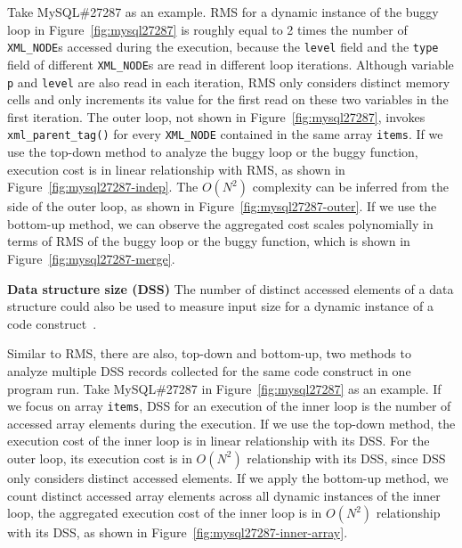 Take MySQL\#27287 as an example.
RMS for a dynamic instance of
the buggy loop in Figure~\ref{fig:mysql27287}
is roughly equal to 2 times the number of \texttt{XML\_NODE}s 
accessed during the execution, 
because the \texttt{level} field and the \texttt{type} field of 
different \texttt{XML\_NODE}s are read in different loop iterations.
Although variable \texttt{p} and \texttt{level} are also read in each iteration,
RMS only considers distinct memory cells and 
only increments its value for the first read on these two variables in the first iteration. 
The outer loop, not shown in Figure~\ref{fig:mysql27287}, 
invokes \texttt{xml\_parent\_tag()} for every \texttt{XML\_NODE} contained
in the same array \texttt{items}.
If we use the top-down method to analyze the buggy loop
or the buggy function, 
execution cost is in linear relationship with RMS, 
as shown in Figure~\ref{fig:mysql27287-indep}.
The $O(N^2)$ complexity can be inferred from the side of the outer loop, 
as shown in Figure~\ref{fig:mysql27287-outer}. 
If we use the bottom-up method, 
we can observe the aggregated cost scales 
polynomially in terms of RMS of the buggy loop 
or the buggy function, 
which is shown in Figure~\ref{fig:mysql27287-merge}. 

\noindent\textbf{Data structure size (DSS)}
The number of distinct accessed elements of a data 
structure could also be used to measure 
input size for a dynamic instance of a code construct~\cite{AlgoProf}. 

Similar to RMS, there are also, top-down and bottom-up, 
two methods to analyze 
multiple DSS records collected for the same code 
construct in one program run.
Take MySQL\#27287 in Figure~\ref{fig:mysql27287} as an example.
If we focus on array \texttt{items},
DSS for an execution of the inner loop is the number of 
accessed array elements during the execution.
If we use the top-down method, the execution cost 
of the inner loop is in linear relationship with its DSS.
For the outer loop, its execution cost is in $O(N^2)$ relationship with its DSS,
since DSS only considers distinct accessed elements.
If we apply the bottom-up method, 
we count distinct accessed array elements across all dynamic instances of the inner loop,
the aggregated execution cost of the inner loop is in $O(N^2)$ relationship with its DSS, 
as shown in Figure~\ref{fig:mysql27287-inner-array}.   

